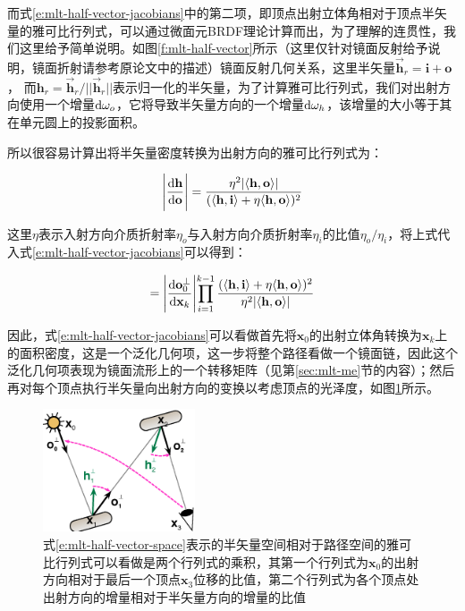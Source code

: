 而式\ref{e:mlt-half-vector-jacobians}中的第二项，即顶点出射立体角相对于顶点半矢量的雅可比行列式，可以通过微面元BRDF理论\cite{a:RobustMonteCarloMethodsforLightTransportSimulation}计算而出，为了理解的连贯性，我们这里给予简单说明。如图\ref{f:mlt-half-vector}所示（这里仅针对镜面反射给予说明，镜面折射请参考原论文中的描述）镜面反射几何关系，这里半矢量$\vec{\mathbf{h}}_r = \mathbf{i} + \mathbf{o}$， 而$\mathbf{h}_r = \vec{\mathbf{h}}_r / ||\vec{\mathbf{h}}_r||$表示归一化的半矢量，为了计算雅可比行列式，我们对出射方向使用一个增量${\rm d}\omega_o$，它将导致半矢量方向的一个增量${\rm d}\omega_h$，该增量的大小等于其在单元圆上的投影面积。

所以很容易计算出将半矢量密度转换为出射方向的雅可比行列式为：

\begin{equation}
	\Bigg|\frac{{\rm d}\mathbf{h}}{{\rm d}\mathbf{o}}\Bigg|=\frac{\eta^{2}|\langle\mathbf{h},\mathbf{o}\rangle|}{(\langle\mathbf{h},\mathbf{i}\rangle+\eta\langle\mathbf{h},\mathbf{o}\rangle)^{2}}
\end{equation}

\noindent 这里$\eta$表示入射方向介质折射率$\eta_o$与入射方向介质折射率$\eta_i$的比值$\eta_o/\eta_i$，将上式代入式\ref{e:mlt-half-vector-jacobians}可以得到：

\begin{equation}\label{e:mlt-half-vector-space-jacobian}
	=\Biggl|\frac{{\rm d}\mathbf{o}^{\perp}_0}{{\rm d}\mathbf{x}_k}\Biggl|\prod^{k-1}_{i=1}\frac{(\langle\mathbf{h},\mathbf{i}\rangle+\eta\langle\mathbf{h},\mathbf{o}\rangle)^{2}}{\eta^{2}|\langle\mathbf{h},\mathbf{o}\rangle|}
\end{equation}

\noindent 因此，式\ref{e:mlt-half-vector-jacobians}可以看做首先将$\mathbf{x}_0$的出射立体角转换为$\mathbf{x}_k$上的面积密度，这是一个泛化几何项，这一步将整个路径看做一个镜面链，因此这个泛化几何项表现为镜面流形上的一个转移矩阵（见第\ref{sec:mlt-me}节的内容）；然后再对每个顶点执行半矢量向出射方向的变换以考虑顶点的光泽度，如图\ref{f:mlt-half-vector-space-jacobians}所示。

\begin{figure}
	\sidecaption
	\includegraphics[width=0.4\textwidth]{figures/mlt/half-vector-space-jacobians}
	\caption{式\ref{e:mlt-half-vector-space}表示的半矢量空间相对于路径空间的雅可比行列式可以看做是两个行列式的乘积，其第一个行列式为$\mathbf{x}_0$的出射方向相对于最后一个顶点$\mathbf{x}_3$位移的比值，第二个行列式为各个顶点处出射方向的增量相对于半矢量方向的增量的比值}
	\label{f:mlt-half-vector-space-jacobians}
\end{figure}




